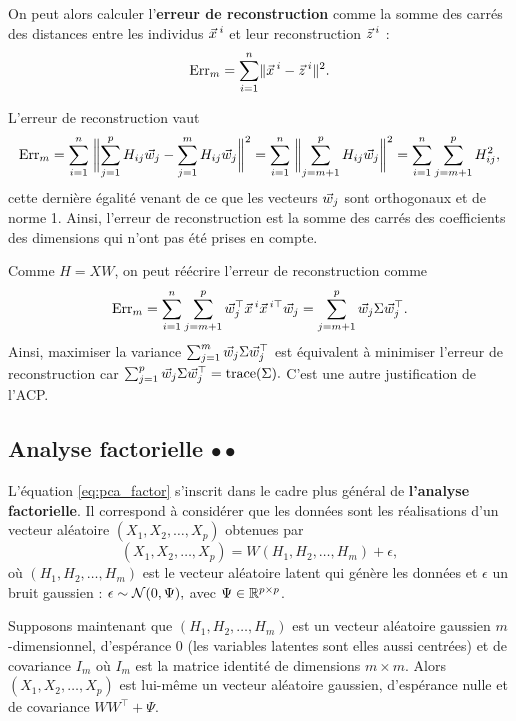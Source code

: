 On peut alors calculer l'\textbf{erreur de reconstruction} comme la somme des
carrés des distances entre les individus $\xx^i$ et leur reconstruction $\zz^i$ :
\begin{equation}
  \label{eq:pca_reconstruction_error}
  \text{Err}_m = \sum_{i=1}^n \norm{\xx^i - \zz^i}^2.
\end{equation}

L'erreur de reconstruction vaut 
\[
  \text{Err}_m = \sum_{i=1}^n \; \bignorm{\sum_{j=1}^p H_{ij} \ww_j - \sum_{j=1}^m H_{ij} \ww_j }^2 = 
\sum_{i=1}^n \; \bignorm{\sum_{j=m+1}^p H_{ij} \ww_j }^2 = \sum_{i=1}^n \sum_{j=m+1}^p H_{ij}^2,
\]
cette dernière égalité venant de ce que les vecteurs $\ww_j$ sont orthogonaux
et de norme 1.  Ainsi, l'erreur de reconstruction est la somme des carrés des
coefficients des dimensions qui n'ont pas été prises en compte.

Comme $H = X W$, on peut réécrire l'erreur de reconstruction comme 
\[
  \text{Err}_m = \sum_{i=1}^n \sum_{j=m+1}^p \ww_j^\top \xx^i \xx^{i\top}\ww_j
  = \sum_{j=m+1}^p \ww_j \Sigma \ww_j^\top.
\]
Ainsi, maximiser la variance $\sum_{j=1}^m \ww_j \Sigma \ww_j^\top$ est
équivalent à minimiser l'erreur de reconstruction car
$
\sum_{j=1}^p \ww_j \Sigma \ww_j^\top = \text{trace}(\Sigma).
$
C'est une autre justification de l'ACP.

\subsection{Analyse factorielle $\bullet \bullet$}
L'équation \eqref{eq:pca_factor} s'inscrit dans le cadre plus général de
\textbf{l'analyse factorielle}. Il correspond à considérer que les données sont
les réalisations d'un vecteur aléatoire $(X_1, X_2, \dots, X_p)$ obtenues par
\begin{equation}
  \label{eq:fa_model}
  (X_1, X_2, \dots, X_p) = W (H_1, H_2, \dots, H_m) + \epsilon,
\end{equation}
où $(H_1, H_2, \dots, H_m)$ est le vecteur aléatoire latent qui génère les
données et $\epsilon$ un bruit gaussien : $\epsilon \sim \mathcal{N}(0, \Psi),$ avec
$\Psi \in \mathbb{R}^{p \times p}$.

Supposons maintenant que $(H_1, H_2, \dots, H_m)$ est un vecteur aléatoire
gaussien $m$-dimensionnel, d'espérance $0$ (les variables latentes sont elles
aussi centrées) et de covariance $I_m$ où $I_m$ est la matrice identité de
dimensions $m \times m$. Alors $(X_1, X_2, \dots, X_p)$ est lui-même un vecteur
aléatoire gaussien, d'espérance nulle et de covariance $WW^\top + \Psi$.

